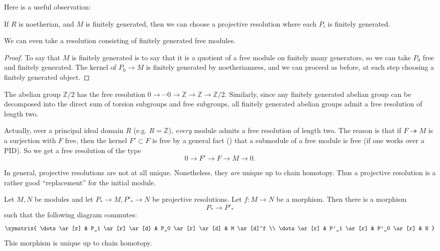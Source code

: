 Here is a useful observation:
\begin{proposition}
If $R$ is noetherian, and $M$ is finitely generated, then we can
choose a
projective resolution where each $P_i$ is finitely generated.
\end{proposition}
We can even take a resolution consisting of finitely generated free modules.
\begin{proof}
To say that $M$ is finitely generated is to say that it is a
quotient of a free module on
finitely many generators, so we can take $P_0$ free and finitely generated. The kernel
of $P_0 \to M$
is finitely generated by noetherianness, and we can proceed as
before, at each step
choosing a finitely generated object.
\end{proof}

\begin{example} The abelian group $\mathbb{Z}/2$ has the free
resolution $0\rightarrow\cdots
0\rightarrow\mathbb{Z}\rightarrow\mathbb{Z}\rightarrow\mathbb{Z}/2$.
Similarly, since any finitely generated abelian group can be
decomposed into the direct sum of torsion subgroups and free
subgroups, all finitely generated abelian groups admit 
a free resolution of length two.

Actually, over a principal ideal domain $R$ (e.g. $R=\mathbb{Z}$),
\emph{every} module admits a free resolution of length two. The reason is that
if $F \twoheadrightarrow M$ is a surjection with $F$ free, then the kernel $F'
\subset F$ is free by a general fact () that a submodule
of a free module is free (if one works over a PID). So we get a free
resolution of the type
\[ 0 \to F' \to F \to M \to 0.  \]
\end{example}


In general, projective resolutions are not at all unique. 
Nonetheless, they \emph{are} unique up to chain homotopy. Thus a projective
resolution is a rather good ``replacement'' for the initial module.

\begin{proposition} 
Let $M, N$ be modules and let $P_* \to M, P'_* \to N$ be projective
resolutions. Let $f: M \to N$ be a morphism. Then there is a morphism
\[ P_* \to P'_*  \]
such that the following diagram commutes:
\[ 
\xymatrix{
\dots \ar[r] &  P_1 \ar[r] \ar[d]  &  P_0 \ar[r] \ar[d]  &  M \ar[d]^f  \\
\dots \ar[r] &  P'_1 \ar[r] &  P'_0 \ar[r] &  N
}
\]
This morphism is unique up to chain homotopy.
\end{proposition} 


